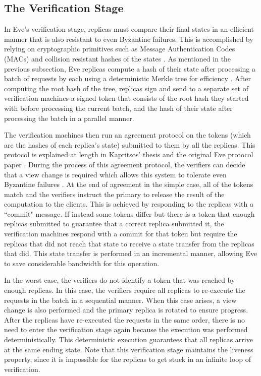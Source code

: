 \documentclass[11pt, oneside]{report}
\begin{document}
\subsection{The Verification Stage}\label{EveVerification}
In Eve's verification stage, replicas must compare their final states in an efficient manner that is also resistant to even Byzantine failures. 
This is accomplished by relying on cryptographic primitives such as Message Authentication Codes (MACs) and collision resistant hashes of the states \cite{eve}. 
As mentioned in the previous subsection, Eve replicas compute a hash of their state after processing a batch of requests by each using a deterministic Merkle tree for efficiency \cite{eve}. 
After computing the root hash of the tree, replicas sign and send to a separate set of verification machines a signed token that consists of the root hash they started with before processing the current batch, and the hash of their state after processing the batch in a parallel manner.

The verification machines then run an agreement protocol on the tokens (which are the hashes of each replica's state) submitted to them by all the replicas. This protocol is explained at length in Kapritsos' thesis and the original Eve protocol paper \cite{manosThesis, eve}.
During the process of this agreement protocol, the verifiers can decide that a view change is required which allows this system to tolerate even Byzantine failures \cite{upRight}.
At the end of agreement in the simple case, all of the tokens  match and the verifiers instruct the primary to release the result of the computation to the clients. 
This is achieved by responding to the replicas with a ``commit" message. 
If instead some tokens differ but there is a token that enough replicas submitted to guarantee that a correct replica submitted it, the verification machines respond with a commit for that token but require the replicas that did not reach that state to receive a state transfer from the replicas that did. This state transfer is performed in an incremental manner, allowing Eve to save considerable bandwidth for this operation.

In the worst case, the verifiers do not identify a token that was reached by enough replicas. 
In this case, the verifiers require all replicas to re-execute the requests in the batch in a sequential manner. 
When this case arises, a view change is also performed and the primary replica is rotated to ensure progress.
After the replicas have re-executed the requests in the same order, there is no need to enter the verification stage again because the execution was performed deterministically. 
This deterministic execution guarantees that all replicas arrive at the same ending state.
Note that this verification stage maintains the liveness property, since it is impossible for the replicas to get stuck in an infinite loop of verification.
\end{document}
